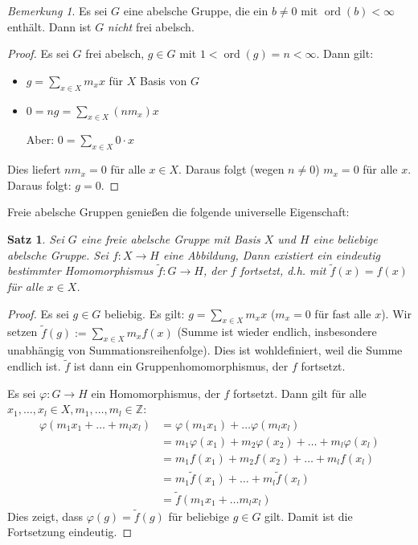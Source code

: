 \documentclass[12pt]{scrartcl} %
\newtheorem{thm}{Satz}[section]
\theoremstyle{definition}
\theoremstyle{remark}
\newtheorem*{nb}{Bemerkung}
\begin{document}
\begin{nb}
  Es sei $G$ eine abelsche Gruppe, die ein $b \neq 0 $ mit $\operatorname{ord}(b) < \infty$ enthält. Dann ist $G$ \emph{nicht} frei abelsch.
\end{nb}

\begin{proof}
  Es sei $G$ frei abelsch, $g \in G$ mit $ 1 < \operatorname{ord}(g) = n < \infty$. Dann gilt:
  \begin{itemize}
    \item $g = \sum_{x \in X} m_x x $ für $X$ Basis von $G$ 
    \item $0 = ng = \sum_{x \in X} (n m_x) x $
    \item[Aber:] $0 = \sum_{x \in X} 0 \cdot x$
  \end{itemize}
  Dies liefert $n m_x = 0$ für alle $x \in X$. Daraus folgt (wegen $n \neq 0$) $m_x = 0$ für alle $x$. Daraus folgt: $g = 0$.
\end{proof}

Freie abelsche Gruppen genießen die folgende universelle Eigenschaft:  

\begin{thm}
  Sei $G$ eine freie abelsche Gruppe mit Basis $X$ und $H$ eine beliebige abelsche Gruppe. Sei $f : X \to H$ eine Abbildung, Dann existiert ein eindeutig bestimmter Homomorphismus $\tilde{f}: G \to H$, der $f$ fortsetzt, d.h. mit $\tilde{f}(x) = f(x)$ für alle $x \in X$.
\end{thm}
\begin{proof}
  Es sei $g \in G$ beliebig. Es gilt: $g = \sum_{x \in X}m_x x$ ($ m_x = 0$ für fast alle $x$).
  Wir setzen $\tilde{f}(g) := \sum_{x \in X} m_x f(x)$ (Summe ist wieder endlich, insbesondere unabhängig von Summationsreihenfolge). Dies ist wohldefiniert, weil die Summe endlich ist. $\tilde{f}$ ist dann ein Gruppenhomomorphismus, der $f$ fortsetzt. %

  Es sei $\varphi : G \to H$ ein Homomorphismus, der $f$ fortsetzt. Dann gilt für alle $x_1,\dots,x_l \in X, m_1,\dots,m_l \in \mathbb{Z}$: 
  \begin{align*}
  \varphi(m_1 x_1 + \dots + m_l x_l) 
  &= \varphi( m_1 x_1) + \dots \varphi( m_l x_l ) \\
  &= m_1 \varphi(x_1) + m_2 \varphi(x_2) + \dots + m_l \varphi(x_l) \\
  &= m_1 f(x_1) + m_2 f(x_2) + \dots + m_l f(x_l) \\
  &= m_1 \tilde{f}(x_1) + \dots + m_l \tilde{f}(x_l)\\
  &= \tilde{f}( m_1 x_1 + \dots m_l x_l)
  \end{align*}
  Dies zeigt, dass $\varphi(g) = \tilde{f}(g) $ für beliebige $g \in G$ gilt. Damit ist die Fortsetzung eindeutig.
\end{proof} 
\end{document}
